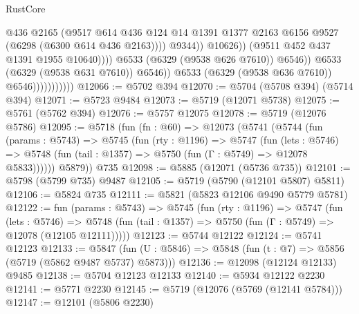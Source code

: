 \begin{lexlean}{RustCore}
\begin{coremodule}
                                                  @436
                                                  @2165
                                                  (@9517
                                                    @614
                                                    @436
                                                    @124
                                                    @14
                                                    @1391
                                                    @1377
                                                    @2163
                                                    @6156
                                                    @9527
                                                    (@6298 (@6300 @614 @436 @2163))))
                                                @9344))
                                            @10626))
                                        (@9511 @452 @437 @1391 @1955 @10640))))
                                  @6533
                                  (@6329 (@9538 @626 @7610))
                                  @6546))
                              @6533
                              (@6329 (@9538 @631 @7610))
                              @6546))
                          @6533
                          (@6329 (@9538 @636 @7610))
                          @6546)))))))))))
@12066 := @5702 @394
@12070 := @5704 (@5708 @394) (@5714 @394)
@12071 := @5723 @9484
@12073 := @5719 (@12071 @5738)
@12075 := @5761 (@5762 @394)
@12076 := @5757 @12075
@12078 := @5719 (@12076 @5786)
@12095 := @5718
    (fun (fn : @60) =>
    @12073
      (@5741
        (@5744
          (fun (params : @5743) =>
          @5745
            (fun (rty : @1196) =>
            @5747
              (fun (lets : @5746) =>
              @5748 (fun (tail : @1357) => @5750 (fun (Γ : @5749) => @12078 @5833))))))
        @5879))
    @735
@12098 := @5885 (@12071 (@5736 @735))
@12101 := @5798 (@5799 @735) @9487
@12105 := @5719 (@5790 (@12101 @5807) @5811)
@12106 := @5824 @735
@12111 := @5821 (@5823 @12106 @9490 @5779 @5781)
@12122 := fun (params : @5743) =>
  @5745
    (fun (rty : @1196) =>
    @5747
      (fun (lets : @5746) =>
      @5748 (fun (tail : @1357) => @5750 (fun (Γ : @5749) => @12078 (@12105 @12111)))))
@12123 := @5744 @12122
@12124 := @5741 @12123
@12133 := @5847 (fun (U : @5846) => @5848 (fun (t : @7) => @5856 (@5719 (@5862 @9487 @5737) @5873)))
@12136 := @12098 (@12124 @12133) @9485
@12138 := @5704 @12123 @12133
@12140 := @5934 @12122 @2230
@12141 := @5771 @2230
@12145 := @5719 (@12076 (@5769 (@12141 @5784)))
@12147 := @12101 (@5806 @2230)

\end{coremodule}
\end{lexlean}
